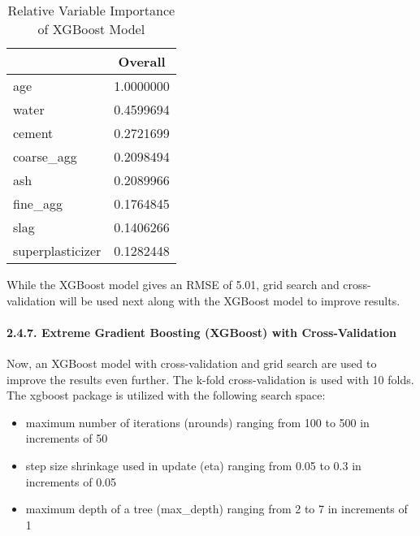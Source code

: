 \documentclass[
]{article}
\providecommand{\tightlist}{%
  \setlength{\itemsep}{0pt}\setlength{\parskip}{0pt}}
\begin{document}
\begin{table}[H]

\caption{\label{tab:Variable Importance - XGB}Relative Variable Importance of XGBoost Model}
\centering
\fontsize{11}{13}\selectfont
\begin{tabular}[t]{|>{}l|||>{}c|}
\hline
  & Overall\\
\hline
age & 1.0000000\\
\hline
water & 0.4599694\\
\hline
cement & 0.2721699\\
\hline
coarse\_agg & 0.2098494\\
\hline
ash & 0.2089966\\
\hline
fine\_agg & 0.1764845\\
\hline
slag & 0.1406266\\
\hline
superplasticizer & 0.1282448\\
\hline
\end{tabular}
\end{table}

While the XGBoost model gives an RMSE of 5.01, grid search and
cross-validation will be used next along with the XGBoost model to
improve results.

\hypertarget{extreme-gradient-boosting-xgboost-with-cross-validation}{%
\paragraph{2.4.7. Extreme Gradient Boosting (XGBoost) with
Cross-Validation}\label{extreme-gradient-boosting-xgboost-with-cross-validation}}

\hfill\break
Now, an XGBoost model with cross-validation and grid search are used to
improve the results even further. The k-fold cross-validation is used
with 10 folds. The xgboost package is utilized with the following search
space:

\begin{itemize}
\tightlist
\item
  maximum number of iterations (nrounds) ranging from 100 to 500 in
  increments of 50
\item
  step size shrinkage used in update (eta) ranging from 0.05 to 0.3 in
  increments of 0.05
\item
  maximum depth of a tree (max\_depth) ranging from 2 to 7 in increments
  of 1
\end{itemize}
\end{document}
